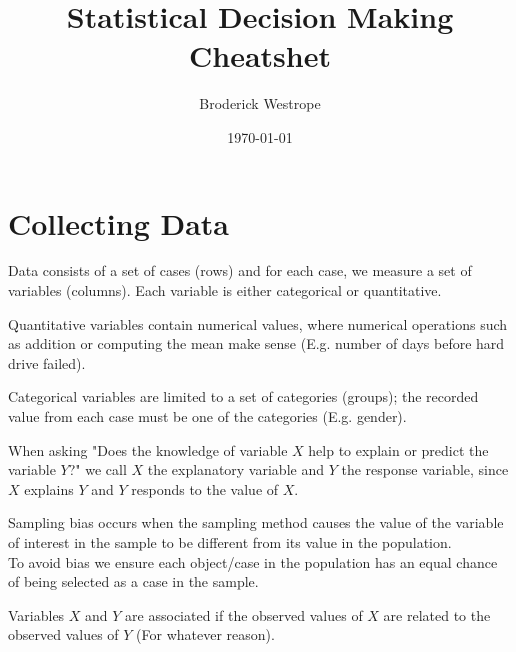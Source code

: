\documentclass[12pt]{article}
\title{Statistical Decision Making Cheatshet}
\author{Broderick Westrope}
\date{\today}
\begin{document}
\maketitle	

\tableofcontents
\pagebreak


\section{Collecting Data}

\begin{tcolorbox}[title=Data]
    Data consists of a set of cases (rows) and for each case, we measure a set of variables (columns). Each variable is either categorical or quantitative.
\end{tcolorbox}

\begin{tcolorbox}[title=Quantitative Variables]
    Quantitative variables contain numerical values, where numerical operations such as addition or computing the mean make sense (E.g. number of days before hard drive failed).
\end{tcolorbox}

\begin{tcolorbox}[title=Categorical Variables]
    Categorical variables are limited to a set of categories (groups); the recorded value from each case must be one of the categories (E.g. gender).
\end{tcolorbox}

\begin{tcolorbox}[title=Explanatory \& Response Variables]
    When asking "Does the knowledge of variable $X$ help to explain or predict the variable $Y$?" we call $X$ the explanatory variable and $Y$ the response variable, since $X$ explains $Y$ and $Y$ responds to the value of $X$.
\end{tcolorbox}

\begin{tcolorbox}[title=Sampling Bias]
    Sampling bias occurs when the sampling method causes the value of the variable of interest in the sample to be different from its value in the population.\\
    To avoid bias we ensure each object/case in the population has an equal chance of being selected as a case in the sample.
\end{tcolorbox}

\begin{tcolorbox}[title=Association]
    Variables $X$ and $Y$ are associated if the observed values of $X$ are related to the observed values of $Y$ (For whatever reason).
\end{tcolorbox}
\end{document}
